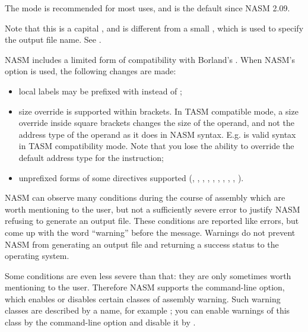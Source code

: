 The  mode is recommended for most uses, and is the default
since NASM 2.09.

Note that this is a capital , and is different from a small ,
which is used to specify the output file name. See .


NASM includes a limited form of compatibility with Borland's .
When NASM's  option is used, the following changes are made:

\begin{itemize}
    \item{local labels may be prefixed with  instead of ;}

    \item{size override is supported within brackets. In TASM compatible mode,
        a size override inside square brackets changes the size of the operand,
        and not the address type of the operand as it does in NASM syntax. E.g.
         is valid syntax in TASM compatibility mode.
        Note that you lose the ability to override the default address type for
        the instruction;}

    \item{unprefixed forms of some directives supported (, ,
        , , , , ,
        , , ).}
\end{itemize}


NASM can observe many conditions during the course of assembly which
are worth mentioning to the user, but not a sufficiently severe
error to justify NASM refusing to generate an output file. These
conditions are reported like errors, but come up with the word
``warning'' before the message. Warnings do not prevent NASM from
generating an output file and returning a success status to the
operating system.

Some conditions are even less severe than that: they are only
sometimes worth mentioning to the user. Therefore NASM supports the
 command-line option, which enables or disables certain
classes of assembly warning. Such warning classes are described by a
name, for example ; you can enable warnings of
this class by the command-line option  and
disable it by .

